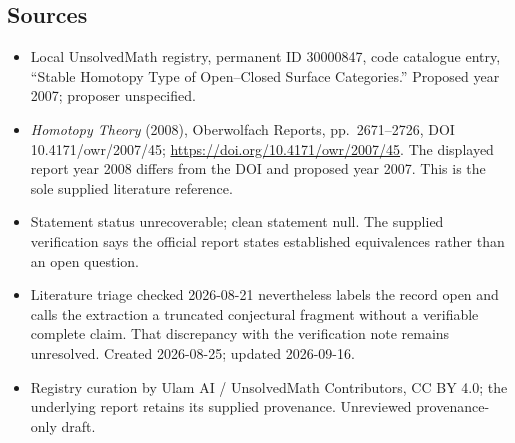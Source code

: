 \documentclass[11pt]{article}
\begin{document}
\subsection{Sources}
\begin{itemize}
\item Local UnsolvedMath registry, permanent ID 30000847, code catalogue entry, ``Stable Homotopy Type of Open--Closed Surface Categories.'' Proposed year 2007; proposer unspecified.
\item \emph{Homotopy Theory} (2008), Oberwolfach Reports, pp.\ 2671--2726, DOI 10.4171/owr/2007/45; \url{https://doi.org/10.4171/owr/2007/45}. The displayed report year 2008 differs from the DOI and proposed year 2007. This is the sole supplied literature reference.
\item Statement status unrecoverable; clean statement null. The supplied verification says the official report states established equivalences rather than an open question.
\item Literature triage checked 2026-08-21 nevertheless labels the record open and calls the extraction a truncated conjectural fragment without a verifiable complete claim. That discrepancy with the verification note remains unresolved. Created 2026-08-25; updated 2026-09-16.
\item Registry curation by Ulam AI / UnsolvedMath Contributors, CC BY 4.0; the underlying report retains its supplied provenance. Unreviewed provenance-only draft.
\end{itemize}
\end{document}
